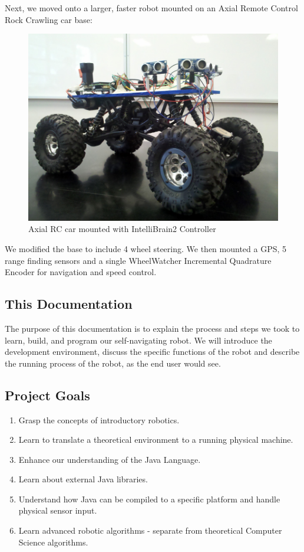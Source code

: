 \documentclass[12pt]{article}
\begin{document}
Next, we moved onto a larger, faster robot mounted on an Axial Remote Control Rock Crawling car base:
\begin{figure}[h]
\centerline{\includegraphics{img/bigBot1}}
\caption{Axial RC car mounted with IntelliBrain2 Controller}
\end{figure}

We modified the base to include 4 wheel steering.  We then mounted a GPS, 5 range finding sensors and a single WheelWatcher Incremental Quadrature Encoder for navigation and speed control.

\subsection{This Documentation}
The purpose of this documentation is to explain the process and steps we took to learn, build, and program our self-navigating robot.  We will introduce the development environment, discuss the specific functions of the robot and describe the running process of the robot, as the end user would see.

\subsection{Project Goals}
\begin{enumerate}
\item Grasp the concepts of introductory robotics.
\item Learn to translate a theoretical environment to a running physical machine.
\item Enhance our understanding of the Java Language.
\item Learn about external Java libraries.
\item Understand how Java can be compiled to a specific platform and handle physical sensor input.
\item Learn advanced robotic algorithms - separate from theoretical Computer Science algorithms.
\end{enumerate}
\end{document}
